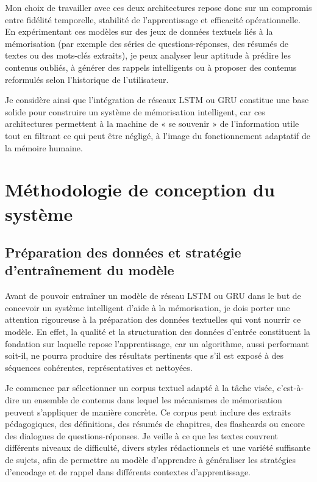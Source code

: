 \documentclass[11pt,a4paper]{report}
\begin{document}
Mon choix de travailler avec ces deux architectures repose donc sur un compromis entre fidélité temporelle, stabilité de l’apprentissage et efficacité opérationnelle. En expérimentant ces modèles sur des jeux de données textuels liés à la mémorisation (par exemple des séries de questions-réponses, des résumés de textes ou des mots-clés extraits), je peux analyser leur aptitude à prédire les contenus oubliés, à générer des rappels intelligents ou à proposer des contenus reformulés selon l’historique de l’utilisateur.

Je considère ainsi que l’intégration de réseaux LSTM ou GRU constitue une base solide pour construire un système de mémorisation intelligent, car ces architectures permettent à la machine de « se souvenir » de l’information utile tout en filtrant ce qui peut être négligé, à l’image du fonctionnement adaptatif de la mémoire humaine.

\section{Méthodologie de conception du système}

\subsection{Préparation des données et stratégie d’entraînement du modèle}

Avant de pouvoir entraîner un modèle de réseau LSTM ou GRU dans le but de concevoir un système intelligent d’aide à la mémorisation, je dois porter une attention rigoureuse à la préparation des données textuelles qui vont nourrir ce modèle. En effet, la qualité et la structuration des données d’entrée constituent la fondation sur laquelle repose l’apprentissage, car un algorithme, aussi performant soit-il, ne pourra produire des résultats pertinents que s’il est exposé à des séquences cohérentes, représentatives et nettoyées.

Je commence par sélectionner un corpus textuel adapté à la tâche visée, c’est-à-dire un ensemble de contenus dans lequel les mécanismes de mémorisation peuvent s’appliquer de manière concrète. Ce corpus peut inclure des extraits pédagogiques, des définitions, des résumés de chapitres, des flashcards ou encore des dialogues de questions-réponses. Je veille à ce que les textes couvrent différents niveaux de difficulté, divers styles rédactionnels et une variété suffisante de sujets, afin de permettre au modèle d’apprendre à généraliser les stratégies d’encodage et de rappel dans différents contextes d’apprentissage.
\end{document}
